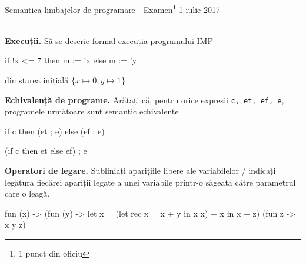 \documentclass[addpoints,12pt,a4paper,answers]{exam}
\begin{document}
\begin{center}


Semantica limbajelor de programare---Examen\footnote{1 punct din oficiu} \hfill  1 iulie 2017 \\ \ \\

\end{center}


\begin{questions}
\question[3] \textbf{Execuții. }
Să se descrie formal execuția programului IMP
\begin{asciiml}
if !x <= 7 then m := !x else m := !y
\end{asciiml}

\vspace{-1ex}din starea inițială \(\{x \mapsto 0, y\mapsto 1\}\)

\question[1] \textbf{Echivalență de programe. }
Arătați că, pentru orice expresii \lstinline$c, et, ef, e$,
programele următoare sunt semantic echivalente
\begin{asciiml}
if c then (et ; e) else (ef ; e)

(if c then et else ef) ; e
\end{asciiml}

\vspace{-1ex}\question[1] \textbf{Operatori de legare. } Subliniați aparițiile libere ale variabilelor / indicați legătura fiecărei apariții legate a unei variabile printr-o săgeată către parametrul care o leagă.

\begin{asciiml}
fun (x) -> (fun (y) -> let x = (let rec x = x + y in x x) + x in x + z) (fun z -> x y z)
\end{asciiml}


\end{questions}
\end{document}
